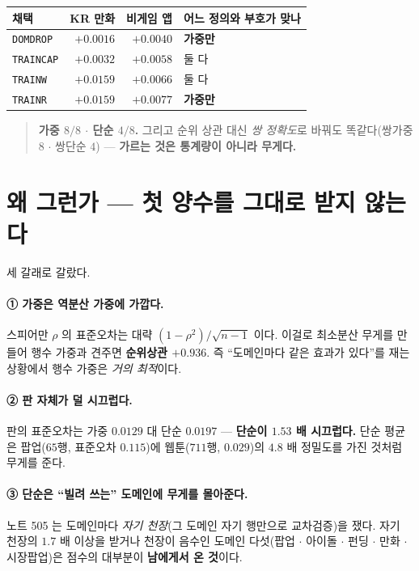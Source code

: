 \documentclass[11pt]{article}
\begin{document}
\begin{center}
\begin{tabular}{lrrl}
\hline
채택 & KR 만화 & 비게임 앱 & 어느 정의와 부호가 맞나 \\
\hline
\texttt{DOMDROP} & $+0.0016$ & $+0.0040$ & \textbf{가중만} \\
\texttt{TRAINCAP} & $+0.0032$ & $+0.0058$ & 둘 다 \\
\texttt{TRAINW} & $+0.0159$ & $+0.0066$ & 둘 다 \\
\texttt{TRAINR} & $+0.0159$ & $+0.0077$ & \textbf{가중만} \\
\hline
\end{tabular}
\end{center}

\begin{quote}
\textbf{가중 $8/8$ $\cdot$ 단순 $4/8$.} 그리고 순위 상관 대신 \emph{쌍 정확도}로
바꿔도 똑같다(쌍가중 $8$ $\cdot$ 쌍단순 $4$) --- \textbf{가르는 것은 통계량이
아니라 무게다.}
\end{quote}

\section{왜 그런가 --- 첫 양수를 그대로 받지 않는다}

세 갈래로 갈랐다.

\paragraph{① 가중은 역분산 가중에 가깝다.} 스피어만 $\rho$ 의 표준오차는
대략 $(1-\rho^2)/\sqrt{n-1}$ 이다. 이걸로 최소분산 무게를 만들어 행수 가중과
견주면 \textbf{순위상관 $+0.936$}. 즉 ``도메인마다 같은 효과가 있다''를 재는
상황에서 행수 가중은 \emph{거의 최적}이다.

\paragraph{② 판 자체가 덜 시끄럽다.} 판의 표준오차는 가중 $0.0129$ 대 단순
$0.0197$ --- \textbf{단순이 $1.53$ 배 시끄럽다.} 단순 평균은 팝업($65$행,
표준오차 $0.115$)에 웹툰($711$행, $0.029$)의 $4.8$ 배 정밀도를 가진 것처럼
무게를 준다.

\paragraph{③ 단순은 ``빌려 쓰는'' 도메인에 무게를 몰아준다.} 노트 505 는
도메인마다 \emph{자기 천장}(그 도메인 자기 행만으로 교차검증)을 쟀다. 자기
천장의 $1.7$ 배 이상을 받거나 천장이 음수인 도메인 다섯(팝업 $\cdot$ 아이돌
$\cdot$ 펀딩 $\cdot$ 만화 $\cdot$ 시장팝업)은 점수의 대부분이 \textbf{남에게서
온 것}이다.
\end{document}
